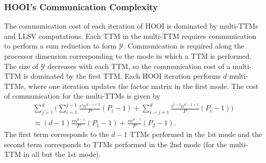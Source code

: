     \subsubsection{HOOI's Communication Complexity} \label{sec:HOOI's Communication Complexity}
        The communication cost of each iteration of HOOI is dominated by multi-TTMs and
        LLSV computations. Each TTM in the multi-TTM requires communication to perform a
        sum reduction to form $\mathcal{Y}$. Communication is required along the processor
        dimension corresponding to the mode in which a TTM is performed.
        The size of $\mathcal{Y}$ decreases with each TTM, so the communication cost of a
        multi-TTM is dominated by the first TTM. Each HOOI iteration performs $d$
        multi-TTMs, where one iteration updates the factor matrix in the first mode.
        The cost of communication for the multi-TTMs is given by
        \begin{multline*}
            \sum_{j=1}^d \bigg(\sum_{i=1}^{j-1} \frac{r^in^{d-i+2}}{P}(P_i-1) + \sum_{i=j+1}^{d} \frac{r^{i-1}n^{d-1+1}}{P}(P_i-1)\bigg) \\ \approx (d-1)\frac{rn^{d-1}}{P}(P_1 - 1) + \frac{rn^{d-1}}{P}(P_2 - 1).
        \end{multline*}
        The first term corresponds to the $d-1$ TTMs performed in the 1st mode and the
        second term corresponds to TTMs performed in the 2nd mode (for the multi-TTM in
        all but the 1st mode).

